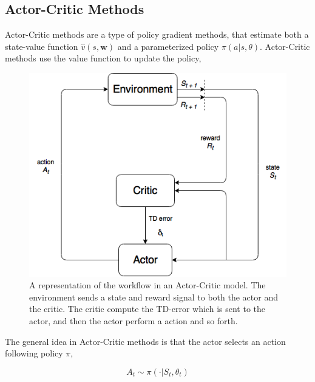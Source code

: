 \documentclass[11pt]{article}
\begin{document}
\subsection{Actor-Critic Methods}

Actor-Critic methods are a type of policy gradient methods, that estimate both a state-value function $\hat{v}(s, \mathbf{w})$ and a parameterized policy $\pi(a | s, \theta)$. Actor-Critic methods use the value function to update the policy,

\begin{figure}[!h]
    \centering
    \includegraphics[scale = 0.5]{include/ActorCriticDiagram.png}
    \caption{A representation of the workflow in an Actor-Critic
    model. The environment sends a state and reward signal to both the actor and the critic. The critic compute the TD-error which is sent to the actor,
and then the actor perform a action and so forth.}
    \label{fig:actor-critic}
\end{figure}

The general idea in Actor-Critic methods is that the actor selects an action following policy $\pi$,

\begin{equation}
    A_{t} \sim \pi(\cdot | S_{t}, \theta_{t})
\end{equation}
\end{document}
